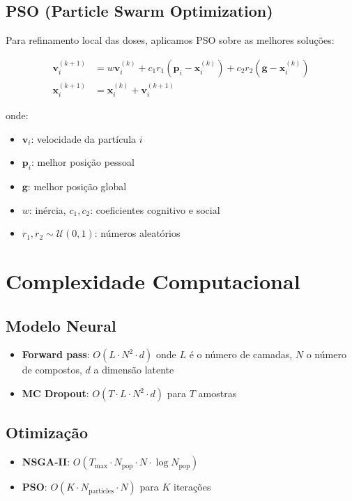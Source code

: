 \documentclass[12pt, a4paper]{article}
\begin{document}
\subsection{PSO (Particle Swarm Optimization)}

Para refinamento local das doses, aplicamos PSO sobre as melhores soluções:

\begin{align}
\mathbf{v}_i^{(k+1)} &= w \mathbf{v}_i^{(k)} + c_1 r_1 (\mathbf{p}_i - \mathbf{x}_i^{(k)}) + c_2 r_2 (\mathbf{g} - \mathbf{x}_i^{(k)}) \\
\mathbf{x}_i^{(k+1)} &= \mathbf{x}_i^{(k)} + \mathbf{v}_i^{(k+1)}
\end{align}

onde:
\begin{itemize}
    \item $\mathbf{v}_i$: velocidade da partícula $i$
    \item $\mathbf{p}_i$: melhor posição pessoal
    \item $\mathbf{g}$: melhor posição global
    \item $w$: inércia, $c_1, c_2$: coeficientes cognitivo e social
    \item $r_1, r_2 \sim \mathcal{U}(0,1)$: números aleatórios
\end{itemize}

\section{Complexidade Computacional}

\subsection{Modelo Neural}

\begin{itemize}
    \item \textbf{Forward pass}: $O(L \cdot N^2 \cdot d)$ onde $L$ é o número de camadas, $N$ o número de compostos, $d$ a dimensão latente
    \item \textbf{MC Dropout}: $O(T \cdot L \cdot N^2 \cdot d)$ para $T$ amostras
\end{itemize}

\subsection{Otimização}

\begin{itemize}
    \item \textbf{NSGA-II}: $O(T_{\max} \cdot N_{\text{pop}} \cdot N \cdot \log N_{\text{pop}})$
    \item \textbf{PSO}: $O(K \cdot N_{\text{particles}} \cdot N)$ para $K$ iterações
\end{itemize}
\end{document}

